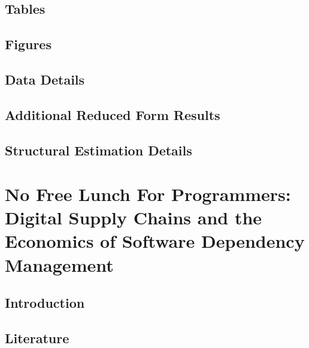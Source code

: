 \documentclass[11pt]{report}
\begin{document}
\clearpage
\begin{subappendices}
\section{Tables} \label{app:pg-tables}


\clearpage
\section{Figures} \label{app:pg-figures}


\clearpage
\section{Data Details} \label{app:pg-data-app}


\clearpage
\onehalfspacing
\section{Additional Reduced Form Results} \label{app:pg-reduced-details}


\clearpage
\onehalfspacing
\section{Structural Estimation Details} \label{app:pg-estim-details}


\end{subappendices}


\chapter{No Free Lunch For Programmers: Digital Supply Chains and the Economics of Software Dependency Management}
\label{ch:dsc}

\section{Introduction}\label{sec:dsc-intro}


\section{Literature}\label{sec:dsc-lit}

\end{document}
